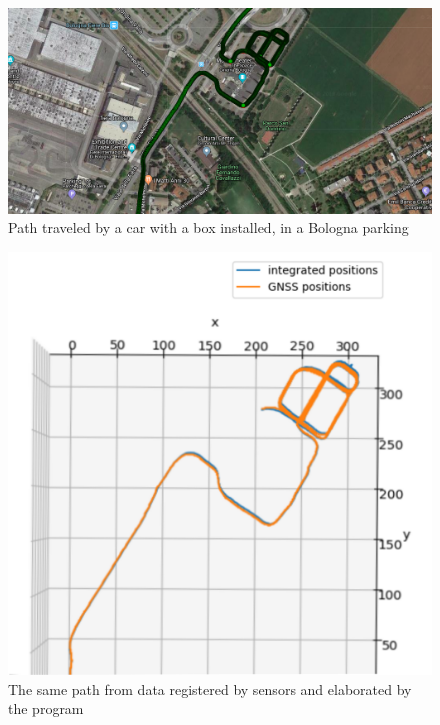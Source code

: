 \begin{figure}[H]
\includegraphics[width=\textwidth]{parking_map.png}
\caption{Path traveled by a car with a box installed, in a Bologna parking}
\end{figure}
\begin{figure}[H]
\centering
\includegraphics[scale=0.6]{parking_3d.png}
\caption{The same path from data registered by sensors and elaborated by the program}
\end{figure}

